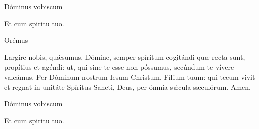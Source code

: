 


\rubric{\Vbar} Dóminus vobiscum

\rubric{\Rbar} Et cum spiritu tuo.

Orémus

Largíre nobis, quǽsumus, Dómine, semper spíritum cogitándi quæ recta sunt, propítius et agéndi: ut, qui sine te esse non póssumus, secúndum te vívere valeámus. Per Dóminum nostrum Iesum Christum, Fílium tuum: qui tecum vivit et regnat in unitáte Spíritus Sancti, Deus, per ómnia sǽcula sæculórum. \rubric{\Rbar} Amen.

\rubric{\Vbar} Dóminus vobiscum

\rubric{\Rbar} Et cum spiritu tuo.
